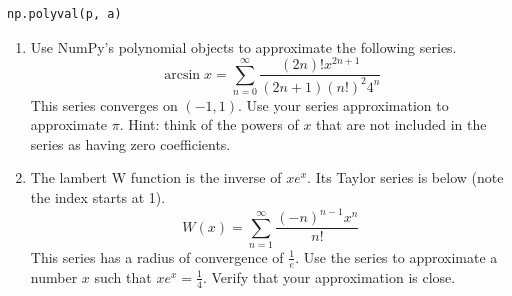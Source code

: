 \begin{lstlisting}
np.polyval(p, a)
\end{lstlisting}

\begin{problem}
\leavevmode
\begin{enumerate}
\item Use NumPy's polynomial objects to approximate the following series.
\[
\arcsin x = \sum_{n=0}^{\infty} \frac{\left(2 n\right) ! x^{2 n + 1}}{\left(2 n + 1\right)\left(n!\right)^2 4^n}
\]
This series converges on $(-1, 1)$. Use your series approximation to approximate $\pi$. Hint: think of the powers of $x$ that
are not included in the series as having zero coefficients.

\item The lambert W function is the inverse of $x e^x$.
Its Taylor series is below (note the index starts at 1).
\[
W(x) = \sum_{n=1}^{\infty} \frac{\left(-n\right)^{n-1} x^n}{n!}
\]
This series has a radius of convergence of $\frac{1}{e}$.
Use the series to approximate a number $x$ such that $x e^x = \frac{1}{4}$.
Verify that your approximation is close.


\end{enumerate}
\end{problem}

